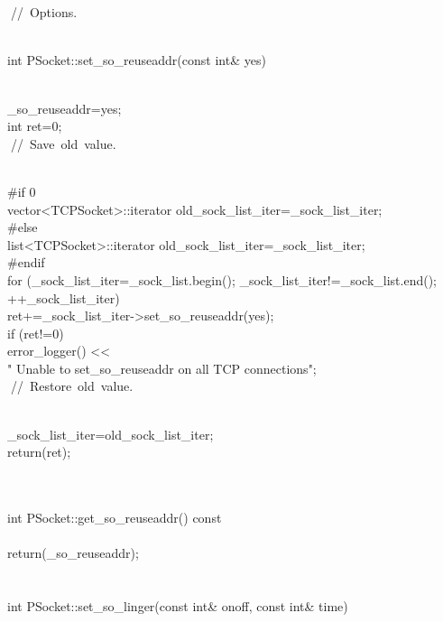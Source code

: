 \documentclass{article}
\begin{document}
\\
 
\\
 
\hbox{// Options.}\strut\\
 int PSocket::set_so_reuseaddr(const int& yes)
\\
 {
\\
     _so_reuseaddr=yes;
\\
         int ret=0;
\\
         
\hbox{// Save old value.}\strut\\
 #if 0
\\
         vector<TCPSocket>::iterator old_sock_list_iter=_sock_list_iter;
\\
 #else
\\
         list<TCPSocket>::iterator old_sock_list_iter=_sock_list_iter;
\\
 #endif
\\
     for (_sock_list_iter=_sock_list.begin(); _sock_list_iter!=_sock_list.end();
\\
          ++_sock_list_iter)
\\
         ret+=_sock_list_iter->set_so_reuseaddr(yes);
\\
     if (ret!=0)
\\
         error_logger() << 
\\
                                 "    Unable to set_so_reuseaddr on all TCP connections\n";
\\
         
\hbox{// Restore old value.}\strut\\
         _sock_list_iter=old_sock_list_iter;
\\
     return(ret);
\\
 }
\\
 
\\
 int PSocket::get_so_reuseaddr() const
\\
 {
\\
         return(_so_reuseaddr);
\\
 }
\\
 
\\
 int PSocket::set_so_linger(const int& onoff, const int& time)
\end{document}
